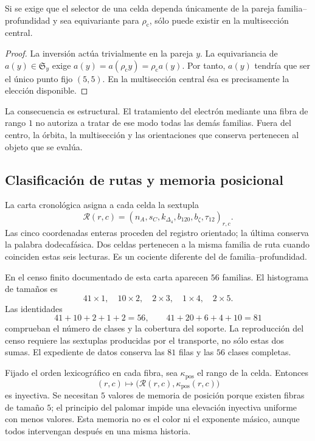 \begin{proposition}
Si se exige que el selector de una celda dependa únicamente de la pareja
familia--profundidad y sea equivariante para \(\rho_{\mathrm c}\), sólo
puede existir en la multisección central.
\end{proposition}
\begin{proof}
La inversión actúa trivialmente en la pareja \(y\). La equivariancia de
\(a(y)\in\mathfrak S_y\) exige
\(a(y)=a(\rho_{\mathrm c}y)=\rho_{\mathrm c}a(y)\).
Por tanto, \(a(y)\) tendría que ser el único punto fijo \((5,5)\).
En la multisección central ésa es precisamente la elección disponible.
\end{proof}

La consecuencia es estructural. El tratamiento del electrón mediante una
fibra de rango \(1\) no autoriza a tratar de ese modo todas las demás
familias. Fuera del centro, la órbita, la multisección y las orientaciones
que conserva pertenecen al objeto que se evalúa.

\subsection{Clasificación de rutas y memoria posicional}

La carta cronológica asigna a cada celda la sextupla
\[
 \mathcal R(r,c)=
 (n_A,s_C,k_{\Delta_4},b_{120},b_{\zeta},\tau_{12})_{r,c}.
\]
Las cinco coordenadas enteras proceden del registro orientado; la última
conserva la palabra dodecafásica. Dos celdas pertenecen a la misma familia
de ruta cuando coinciden estas seis lecturas. Es un cociente diferente
del de familia--profundidad.

En el censo finito documentado de esta carta aparecen \(56\) familias.
El histograma de tamaños es
\[
 41\times1,\quad10\times2,\quad2\times3,\quad1\times4,\quad2\times5.
\]
Las identidades
\[
 41+10+2+1+2=56,\qquad
 41+20+6+4+10=81
\]
comprueban el número de clases y la cobertura del soporte. La reproducción
del censo requiere las sextuplas producidas por el transporte, no sólo estas
dos sumas. El expediente de datos conserva las \(81\) filas y las
\(56\) clases completas.

Fijado el orden lexicográfico en cada fibra, sea \(\kappa_{\mathrm{pos}}\)
el rango de la celda. Entonces
\[
 (r,c)\longmapsto\bigl(\mathcal R(r,c),\kappa_{\mathrm{pos}}(r,c)\bigr)
\]
es inyectiva. Se necesitan \(5\) valores de memoria de posición porque
existen fibras de tamaño \(5\); el principio del palomar impide una
elevación inyectiva uniforme con menos valores. Esta memoria no es el color
ni el exponente másico, aunque todos intervengan después en una misma historia.

